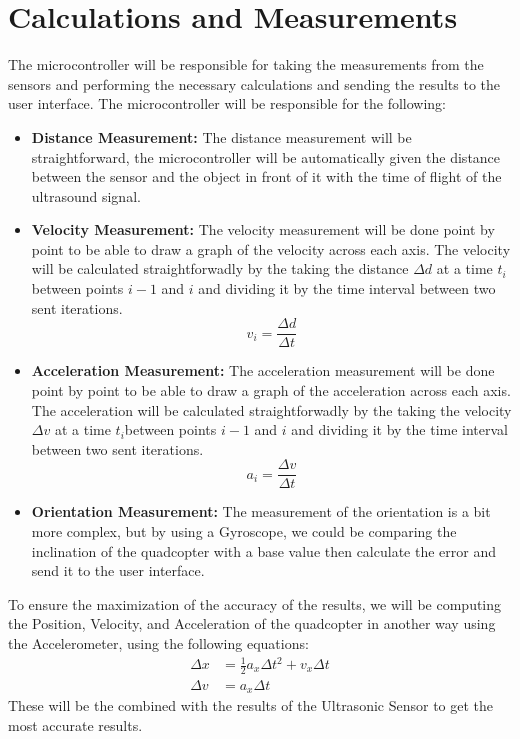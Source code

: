 \documentclass[12pt]{article}
\numberwithin{equation}{section}
\begin{document}
\section{Calculations and Measurements}
The microcontroller will be responsible for taking the measurements from the sensors and performing the necessary calculations and sending the results to the user interface. The microcontroller will be responsible for the following:

\begin{itemize}
  \item \textbf{Distance Measurement:} The distance measurement will be straightforward, the microcontroller will be automatically given the distance between the sensor and the object in front of it with the time of flight of the ultrasound signal.
  \item \textbf{Velocity Measurement:} The velocity measurement will be done point by point to be able to draw a graph of the velocity across each axis. The velocity will be calculated straightforwadly by the taking the distance $\Delta d$ at a time $t_i$ between points $i-1$ and $i$ and dividing it by the time interval between two sent iterations.
    \begin{equation}
      v_i = \frac{\Delta d}{\Delta t}
    \end{equation}  
  \item \textbf{Acceleration Measurement:} The acceleration measurement will be done point by point to be able to draw a graph of the acceleration across each axis. The acceleration will be calculated straightforwadly by the taking the velocity $\Delta v$ at a time $t_i$between points $i-1$ and $i$ and dividing it by the time interval between two sent iterations.
    \begin{equation}
      a_i = \frac{\Delta v}{\Delta t}
    \end{equation}
  \item \textbf{Orientation Measurement:} The measurement of the orientation is a bit more complex, but by using a Gyroscope, we could be comparing the inclination of the quadcopter with a base value then calculate the error and send it to the user interface.
\end{itemize}

To ensure the maximization of the accuracy of the results, we will be computing the Position, Velocity, and Acceleration of the quadcopter in another way using the Accelerometer, using the following equations:
\begin{equation}
  \begin{aligned}
    \Delta x &= \frac{1}{2}a_x\Delta t^2 + v_x\Delta t \\
    \Delta v &= a_x\Delta t
  \end{aligned}
\end{equation}
These will be the combined with the results of the Ultrasonic Sensor to get the most accurate results.
\end{document}
